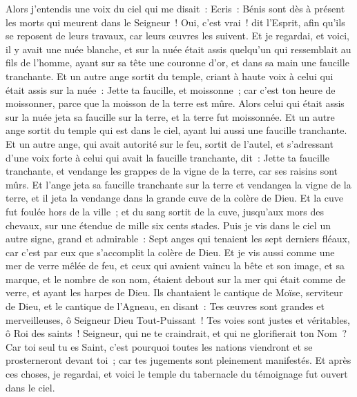 \begin{multicols}{2}
Alors j'entendis une voix du ciel qui me disait~: Ecris~: Bénis sont dès à présent les morts qui meurent dans le Seigneur~! Oui, c'est vrai~! dit l'Esprit, afin qu'ils se reposent de leurs travaux, car leurs œuvres les suivent.
Et je regardai, et voici, il y avait une nuée blanche, et sur la nuée était assis quelqu'un qui ressemblait au fils de l'homme, ayant sur sa tête une couronne d'or, et dans sa main une faucille tranchante.
Et un autre ange sortit du temple, criant à haute voix à celui qui était assis sur la nuée~: Jette ta faucille, et moissonne~; car c'est ton heure de moissonner, parce que la moisson de la terre est mûre.
Alors celui qui était assis sur la nuée jeta sa faucille sur la terre, et la terre fut moissonnée.
Et un autre ange sortit du temple qui est dans le ciel, ayant lui aussi une faucille tranchante.
Et un autre ange, qui avait autorité sur le feu, sortit de l'autel, et s'adressant d'une voix forte à celui qui avait la faucille tranchante, dit~: Jette ta faucille tranchante, et vendange les grappes de la vigne de la terre, car ses raisins sont mûrs.
Et l'ange jeta sa faucille tranchante sur la terre et vendangea la vigne de la terre, et il jeta la vendange dans la grande cuve de la colère de Dieu.
Et la cuve fut foulée hors de la ville~; et du sang sortit de la cuve, jusqu'aux mors des chevaux, sur une étendue de mille six cents stades.
\VerseOne{}Puis je vis dans le ciel un autre signe, grand et admirable~: Sept anges qui tenaient les sept derniers fléaux, car c'est par eux que s'accomplit la colère de Dieu.
Et je vis aussi comme une mer de verre mêlée de feu, et ceux qui avaient vaincu la bête et son image, et sa marque, et le nombre de son nom, étaient debout sur la mer qui était comme de verre, et ayant les harpes de Dieu.
Ils chantaient le cantique de Moïse, serviteur de Dieu, et le cantique de l'Agneau, en disant~: Tes œuvres sont grandes et merveilleuses, ô Seigneur Dieu Tout-Puissant~! Tes voies sont justes et véritables, ô Roi des saints~!
Seigneur, qui ne te craindrait, et qui ne glorifierait ton Nom~? Car toi seul tu es Saint, c'est pourquoi toutes les nations viendront et se prosterneront devant toi~; car tes jugements sont pleinement manifestés.
Et après ces choses, je regardai, et voici le temple du tabernacle du témoignage fut ouvert dans le ciel.

\end{multicols}
